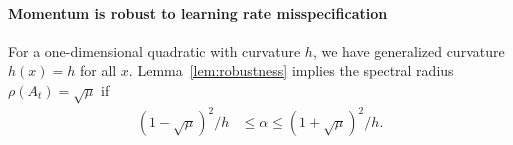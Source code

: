 \documentclass{article}
\newcommand{\mat}[1]{\bm{\mathit{#1}}}
\begin{document}
\paragraph{Momentum is robust to learning rate misspecification}
\label{sec:lr_robustness}
For a one-dimensional quadratic with curvature $h$,
we have generalized curvature $h(x)=h$ for all $x$. Lemma~\ref{lem:robustness} implies the spectral radius $\rho(\mat{A}_t)\!=\!\sqrt{\mu}$ if
\begin{align}
{(1-\sqrt{\mu})^2/h} &\leq \alpha \leq {(1+\sqrt{\mu})^2/h}.
\label{eqn:lr_robustness}
\end{align}
\end{document}
